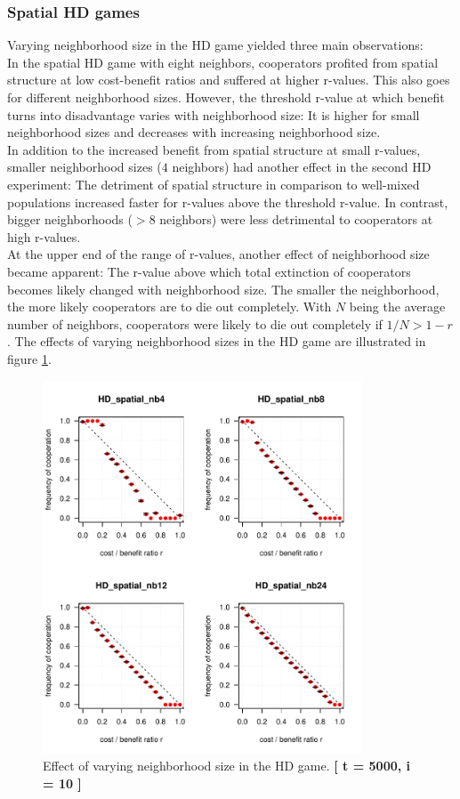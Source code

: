 \subsubsection*{Spatial HD games}
Varying neighborhood size in the HD game yielded three main observations:\\ 
In the spatial HD game with eight neighbors, cooperators profited from spatial structure at low cost-benefit ratios and suffered at higher r-values. This also goes for different neighborhood sizes. However, the threshold r-value at which benefit turns into disadvantage varies with neighborhood size: It is higher for small neighborhood sizes and decreases with increasing neighborhood size.\\
In addition to the increased benefit from spatial structure at small r-values, smaller neighborhood sizes ($4$ neighbors) had another effect in the second HD experiment: The detriment of spatial structure in comparison to well-mixed populations increased faster for r-values above the threshold r-value. In contrast, bigger neighborhoods ($>8$ neighbors) were less detrimental to cooperators at high r-values.\\
At the upper end of the range of r-values, another effect of neighborhood size became apparent: The r-value above which total extinction of cooperators becomes likely changed with neighborhood size. The smaller the neighborhood, the more likely cooperators are to die out completely. With $N$ being the average number of neighbors, cooperators were likely to die out completely if $1 / N > 1 - r$. The effects of varying neighborhood sizes in the HD game are illustrated in figure \ref{fig: task2_4plot}.\\


\begin{figure}[H]
	\centering 
	\includegraphics[width=9.5cm]{task2_4plot}
	\caption{Effect of varying neighborhood size in the HD game.  \textbf{[ t = 5000, i = 10 ]} }\label{fig: task2_4plot}
\end{figure}



